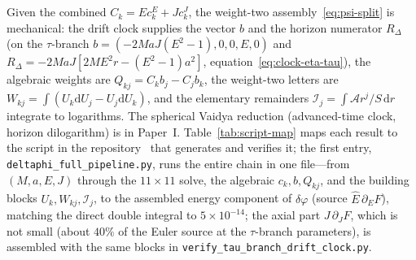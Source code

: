 \documentclass[12pt]{iopart}
\theoremstyle{plain}
\theoremstyle{definition}
\theoremstyle{remark}
\newcommand{\Ehat}{\hat E}
\newcommand{\dd}{\mathrm{d}}
\begin{document}
Given the combined $C_k=\Ehat c_k^{E}+J c_k^{J}$, the weight-two
assembly~\eqref{eq:psi-split} is mechanical: the drift clock supplies the vector
$b$ and the horizon numerator $R_\Delta$ (on the $\tau$-branch
$b=(-2MaJ(E^2-1),0,0,E,0)$ and $R_\Delta=-2MaJ[2ME^2r-(E^2-1)a^2]$,
equation~\eqref{eq:clock-eta-tau}), the algebraic
weights are $Q_{kj}=C_kb_j-C_jb_k$, the weight-two
letters are $W_{kj}=\int(U_k\dd U_j-U_j\dd U_k)$, and the elementary remainders
$\mathcal{I}_j=\int\mathcal{A}r^j/S\,\dd r$ integrate to logarithms. The spherical Vaidya
reduction (advanced-time clock, horizon dilogarithm) is in Paper~I.
Table~\ref{tab:script-map} maps each result to
the script in the repository~\cite{Rosignoli2026Code} that generates and verifies it;
the first entry, \texttt{deltaphi\_full\_pipeline.py}, runs the entire chain in one
file---from $(M,a,E,J)$ through the $11\times11$ solve, the algebraic $c_k,b,Q_{kj}$,
and the building blocks $U_k,W_{kj},\mathcal{I}_j$, to the assembled energy component
of $\delta\varphi$ (source $\Ehat\,\partial_E F$), matching the direct double integral to
$5\times10^{-14}$; the axial part $J\,\partial_J F$, which is not small (about $40\%$ of the
Euler source at the $\tau$-branch parameters), is assembled with the same blocks in
\texttt{verify\_tau\_branch\_drift\_clock.py}.
\end{document}

